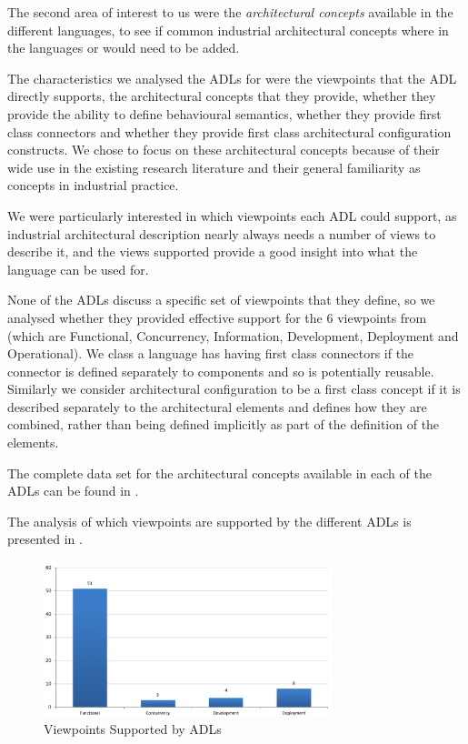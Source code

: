 The second area of interest to us were the \emph{architectural concepts} available in the different languages, to see if common industrial architectural concepts where in the languages or would need to be added.

The characteristics we analysed the ADLs for were the viewpoints that the ADL directly supports, the architectural concepts that they provide, whether they provide the ability to define behavioural semantics, whether they provide first class connectors and whether they provide first class architectural configuration constructs.  We chose to focus on these architectural concepts because of their wide use in the existing research literature and their general familiarity as concepts in industrial practice.

We were particularly interested in which viewpoints each ADL could support, as industrial architectural description nearly always needs a number of views to describe it, and the views supported provide a good insight into what the language can be used for.

None of the ADLs discuss a specific set of viewpoints that they define, so we analysed whether they provided effective support for the 6 viewpoints from \cite{rozanski2011-ssa2e} (which are Functional, Concurrency, Information, Development, Deployment and Operational).  We class a language has having first class connectors if the connector is defined separately to components and so is potentially reusable.  Similarly we consider architectural configuration to be a first class concept if it is described separately to the architectural elements and defines how they are combined, rather than being defined implicitly as part of the definition of the elements.

The complete data set for the architectural concepts available in each of the ADLs can be found in .

The analysis of which viewpoints are supported by the different ADLs is presented in .

\begin{figure}
\centering
\includegraphics[width=0.75\textwidth]{Figures/litreview-adl-viewpoints}
\caption{Viewpoints Supported by ADLs}
\label{figure:litreview-adl-viewpoints}
\end{figure}

